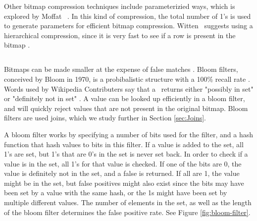 Other bitmap compression techniques include parameterizied ways, which is explored by Moffat \ea~\cite{Moffat1992-tz}. In this kind of compression, the total number of 1's is used to generate parameters for efficient bitmap compression. Witten \ea~suggests using a hierarchical compression, since it is very fast to see if a row is present in the bitmap \cite{Witten1999-qq}. 


\subsection{\bloom}
\label{sub:Bloom Filter}
Bitmaps can be made smaller at the expense of false matches \cite{Witten1999-qq}. Bloom filters, conceived by Bloom in 1970, is a probibalistic structure with a 100\% recall rate \cite{Bloom1970-nr, Wikipedia_contributors2015-lq}. Words used by Wikipedia Contributers say that a \bloom~returns either "possibly in set" or "definitely not in set" \cite{Wikipedia_contributors2015-lq}. A value can be looked up efficiently in a bloom filter, and will quickly reject values that are not present in the original bitmap. Bloom filters are used joins, which we study further in Section \ref{sec:Joins}.

A bloom filter works by specifying a number of bits used for the filter, and a hash function that hash values to bits in this filter. If a value is added to the set, all 1's are set, but 1's that are 0's in the set is never set back. In order to check if a value is in the set, all 1's for that value is checked. If one of the bits are 0, the value is definitely not in the set, and a false is returned. If all are 1, the value might be in the set, but false positives might also exist since the bits may have been set by a value with the same hash, or the 1s might have been set by multiple different values. The number of elements in the set, as well as the length of the bloom filter determines the false positive rate. See Figure \ref{fig:bloom-filter}.

